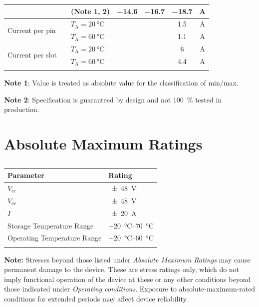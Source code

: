 \documentclass[10pt]{datasheet}
\begin{document}
\begin{table}[h!]
\begin{threeparttable}
\begin{tabularx}{\textwidth}{l | c | X | c c c | c}
             & & (Note 1, 2) & \num{-14.6} & \num{-16.7} & \num{-18.7} & \unit{\A} \\
            \hline
            \multirow{2}{*}{Current per pin} & & $T_\text{A} = \qty{20}{\celsius}$ & & & 1.5 & \unit{\A}\\
            & & $T_\text{A} = \qty{60}{\celsius}$ & & & 1.1 & \unit{\A}\\
            \multirow{2}{*}{Current per slot} & & $T_\text{A} = \qty{20}{\celsius}$ & & & 6 & \unit{\A}\\
            & & $T_\text{A} = \qty{60}{\celsius}$ & & & 4.4 & \unit{\A}\\
            \thickhline
        \end{tabularx}
        \begin{tablenotes}
            \item{\textbf{Note 1}: Value is treated as absolute value for the classification of min/max.}
            \item{\textbf{Note 2}: Specification is guaranteed by design and not \qty{100}{\percent} tested in production.}
        \end{tablenotes}
    \end{threeparttable}
\end{table}

\section{Absolute Maximum Ratings}
\begin{table}[h]
    \caption{}
    \begin{tabularx}{\textwidth}{l | X}
        \thickhline
        \textbf{Parameter} & \textbf{Rating} \hspace{5cm} \\
        \hline
        $V_\text{cc}$ & \qty{\pm 48}{\V} \\
        $V_\text{ee}$ & \qty{\pm 48}{\V} \\
        $I$ & \qty{\pm 20}{\A} \\
        Storage Temperature Range & \qtyrange{-20}{70}{\celsius}\\
        Operating Temperature Range & \qtyrange{-20}{60}{\celsius}\\
        \thickhline
    \end{tabularx}
\end{table}

\textbf{Note:} Stresses beyond those listed under \textit{Absolute Maximum Ratings} may cause permanent damage to the device. These are stress ratings only, which do not imply functional operation of the device at these or any other conditions beyond those indicated under \textit{Operating conditions}. Exposure to absolute-maximum-rated conditions for extended periods may affect device reliability.
\end{document}
